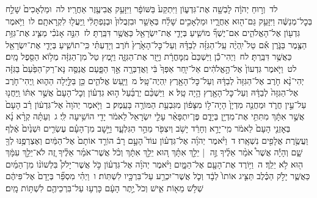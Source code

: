 \documentclass[18pt]{article}
\newcommand{\vart}[1]{\Bfootnote{#1}}	%
\begin{document}
 {\loc לד~}וְר֣וּחַ יְהֹוָ֔ה לָבְשָׁ֖ה אֶת־גִּדְע֑וֹן וַיִּתְקַע֙ בַּשּׁוֹפָ֔ר וַיִּזָּעֵ֥ק אֲבִיעֶ֖זֶר אַחֲרָֽיו׃ \startlock
 {\loc לה~}וּמַלְאָכִים֙ שָׁלַ֣ח בְּכׇל־מְנַשֶּׁ֔ה וַיִּזָּעֵ֥ק גַּם־ה֖וּא אַחֲרָ֑יו וּמַלְאָכִ֣ים שָׁלַ֗ח בְּאָשֵׁ֤ר וּבִזְבֻלוּן֙ וּבְנַפְתָּלִ֔י וַֽיַּעֲל֖וּ לִקְרָאתָֽם׃ \startlock
 {\loc לו~}וַיֹּ֥אמֶר גִּדְע֖וֹן אֶל־הָאֱלֹהִ֑ים אִם־יֶשְׁךָ֞ מוֹשִׁ֧יעַ בְּיָדִ֛י אֶת־יִשְׂרָאֵ֖ל כַּאֲשֶׁ֥ר דִּבַּֽרְתָּ׃ \startlock
 {\loc לז~}הִנֵּ֣ה אָנֹכִ֗י מַצִּ֛יג אֶת־גִּזַּ֥ת הַצֶּ֖מֶר בַּגֹּ֑רֶן אִ֡ם טַל֩ יִֽהְיֶ֨ה עַֽל־הַגִּזָּ֜ה לְבַדָּ֗הּ וְעַל־כׇּל־הָאָ֙רֶץ֙ חֹ֔רֶב וְיָדַעְתִּ֗י כִּֽי־תוֹשִׁ֧יעַ בְּיָדִ֛י אֶת־יִשְׂרָאֵ֖ל כַּאֲשֶׁ֥ר דִּבַּֽרְתָּ׃ \startlock
 {\loc לח~}וַיְהִי־כֵ֕ן וַיַּשְׁכֵּם֙  מִֽמׇּחֳרָ֔ת  וַיָּ֖זַר אֶת־הַגִּזָּ֑ה וַיִּ֤מֶץ טַל֙ מִן־הַגִּזָּ֔ה מְל֥וֹא הַסֵּ֖פֶל מָֽיִם׃ \startlock
 {\loc לט~}וַיֹּ֤אמֶר גִּדְעוֹן֙ אֶל־הָ֣אֱלֹהִ֔ים אַל־יִ֤חַר אַפְּךָ֙ בִּ֔י וַאֲדַבְּרָ֖ה אַ֣ךְ הַפָּ֑עַם אֲנַסֶּ֤ה נָּא־רַק־הַפַּ֙עַם֙ בַּגִּזָּ֔ה יְהִי־נָ֨א חֹ֤רֶב אֶל־הַגִּזָּה֙ לְבַדָּ֔הּ וְעַל־כׇּל־הָאָ֖רֶץ יִֽהְיֶה־טָּֽל׃ \startlock
 {\loc מ~}וַיַּ֧עַשׂ אֱלֹהִ֛ים כֵּ֖ן בַּלַּ֣יְלָה הַה֑וּא וַֽיְהִי־חֹ֤רֶב אֶל־הַגִּזָּה֙ לְבַדָּ֔הּ וְעַל־כׇּל־הָאָ֖רֶץ הָ֥יָה טָֽל׃ 
\startlock
 {\loc א~}וַיַּשְׁכֵּ֨ם יְרֻבַּ֜עַל ה֣וּא גִדְע֗וֹן וְכׇל־הָעָם֙ אֲשֶׁ֣ר אִתּ֔וֹ וַֽיַּחֲנ֖וּ עַל־עֵ֣ין חֲרֹ֑ד וּמַחֲנֵ֤ה מִדְיָן֙ הָיָה־ל֣וֹ מִצָּפ֔וֹן מִגִּבְעַ֥ת הַמּוֹרֶ֖ה בָּעֵֽמֶק׃ \startlock
 {\loc ב~}וַיֹּ֤אמֶר יְהֹוָה֙ אֶל־גִּדְע֔וֹן רַ֗ב הָעָם֙ אֲשֶׁ֣ר אִתָּ֔ךְ מִתִּתִּ֥י אֶת־מִדְיָ֖ן בְּיָדָ֑ם פֶּן־יִתְפָּאֵ֨ר עָלַ֤י יִשְׂרָאֵל֙ לֵאמֹ֔ר יָדִ֖י הוֹשִׁ֥יעָה לִּֽי׃ \startlock
 {\loc ג~}וְעַתָּ֗ה קְרָ֨א נָ֜א בְּאׇזְנֵ֤י הָעָם֙ לֵאמֹ֔ר מִֽי־יָרֵ֣א וְחָרֵ֔ד יָשֹׁ֥ב וְיִצְפֹּ֖ר מֵהַ֣ר הַגִּלְעָ֑ד וַיָּ֣שׇׁב מִן־הָעָ֗ם עֶשְׂרִ֤ים וּשְׁנַ֙יִם֙ אֶ֔לֶף וַעֲשֶׂ֥רֶת אֲלָפִ֖ים נִשְׁאָֽרוּ׃ \startlock
 {\loc ד~}וַיֹּ֨אמֶר יְהֹוָ֜ה אֶל־גִּדְע֗וֹן עוֹד֮ הָעָ֣ם רָב֒ הוֹרֵ֤ד אוֹתָם֙ אֶל־הַמַּ֔יִם וְאֶצְרְפֶ֥נּוּ לְךָ֖ שָׁ֑ם וְהָיָ֡ה אֲשֶׁר֩ אֹמַ֨ר אֵלֶ֜יךָ זֶ֣ה  |  יֵלֵ֣ךְ אִתָּ֗ךְ ה֚וּא יֵלֵ֣ךְ אִתָּ֔ךְ וְכֹ֨ל אֲשֶׁר־אֹמַ֜ר אֵלֶ֗יךָ זֶ֚ה לֹא־יֵלֵ֣ךְ עִמָּ֔ךְ ה֖וּא לֹ֥א יֵלֵֽךְ׃ \startlock
 {\loc ה~}וַיּ֥וֹרֶד אֶת־הָעָ֖ם אֶל־הַמָּ֑יִם וַיֹּ֨אמֶר יְהֹוָ֜ה אֶל־גִּדְע֗וֹן כֹּ֣ל אֲשֶׁר־יָלֹק֩ בִּלְשׁוֹנ֨וֹ מִן־הַמַּ֜יִם כַּאֲשֶׁ֧ר יָלֹ֣ק הַכֶּ֗לֶב תַּצִּ֤יג אוֹתוֹ֙ לְבָ֔ד וְכֹ֛ל אֲשֶׁר־יִכְרַ֥ע עַל־בִּרְכָּ֖יו לִשְׁתּֽוֹת׃ \startlock
 {\loc ו~}וַיְהִ֗י מִסְפַּ֞ר  \edtext{הַֽמְלַקְקִ֤ים}{\vart{א=הַֽמְלַקֲקִ֤ים | }}  בְּיָדָם֙ אֶל־פִּיהֶ֔ם שְׁלֹ֥שׁ מֵא֖וֹת אִ֑ישׁ וְכֹל֙ יֶ֣תֶר הָעָ֔ם כָּרְע֥וּ עַל־בִּרְכֵיהֶ֖ם לִשְׁתּ֥וֹת מָֽיִם׃ \startlock
\end{document}
